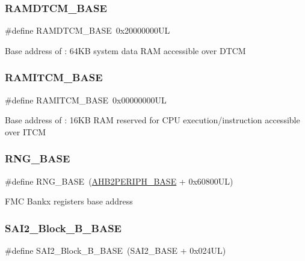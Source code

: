 \subsubsection{\texorpdfstring{RAMDTCM\_BASE}{RAMDTCM\_BASE}}
{\footnotesize\ttfamily \#define R\+A\+M\+D\+T\+C\+M\+\_\+\+B\+A\+SE~0x20000000\+UL}

Base address of \+: 64KB system data R\+AM accessible over D\+T\+CM \mbox{\label{group___peripheral__memory__map_ga8f6d2f2cfd1a621b4ff5d35544ec9f6f}} 
\subsubsection{\texorpdfstring{RAMITCM\_BASE}{RAMITCM\_BASE}}
{\footnotesize\ttfamily \#define R\+A\+M\+I\+T\+C\+M\+\_\+\+B\+A\+SE~0x00000000\+UL}

Base address of \+: 16KB R\+AM reserved for C\+PU execution/instruction accessible over I\+T\+CM \mbox{\label{group___peripheral__memory__map_gab92662976cfe62457141e5b4f83d541c}} 
\subsubsection{\texorpdfstring{RNG\_BASE}{RNG\_BASE}}
{\footnotesize\ttfamily \#define R\+N\+G\+\_\+\+B\+A\+SE~(\mbox{\hyperlink{group___peripheral__memory__map_gaeedaa71d22a1948492365e2cd26cfd46}{A\+H\+B2\+P\+E\+R\+I\+P\+H\+\_\+\+B\+A\+SE}} + 0x60800\+U\+L)}

F\+MC Bankx registers base address \mbox{\label{group___peripheral__memory__map_ga034a6ac8f61e4d15cd9f2f7eca140569}} 
\subsubsection{\texorpdfstring{SAI2\_Block\_B\_BASE}{SAI2\_Block\_B\_BASE}}
{\footnotesize\ttfamily \#define S\+A\+I2\+\_\+\+Block\+\_\+\+B\+\_\+\+B\+A\+SE~(S\+A\+I2\+\_\+\+B\+A\+SE + 0x024\+U\+L)}

